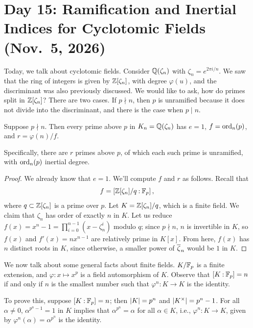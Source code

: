 \section{Day 15: Ramification and Inertial Indices for Cyclotomic Fields (Nov.\ 5, 2026)}
Today, we talk about cyclotomic fields. Consider $\mathbb Q(\zeta_n)$ with $\zeta_n = e^{2\pi i / n}$. We saw that the ring of integers is given by $\mathbb Z[\zeta_n]$, with degree $\varphi(u)$, and the discriminant was also previously discussed. We would like to ask, how do primes split in $\mathbb Z[\zeta_n]$? There are two cases. If $p \nmid n$, then $p$ is unramified because it does not divide into the discriminant, and there is the case when $p \mid n$.

\begin{theorem} \label{thm:ramification_inertia_number_of_primes_for_cyclotomic}
    Suppose $p \nmid n$. Then every prime above $p$ in $K_n = \mathbb Q(\zeta_n)$ has $e = 1$, $f = \operatorname{ord}_n(p)$, and $r = \varphi(n) / f$.
\end{theorem}
Specifically, there are $r$ primes above $p$, of which each such prime is unramified, with $\operatorname{ord}_n(p)$ inertial degree.

\begin{proof}
    We already know that $e = 1$. We'll compute $f$ and $r$ as follows. Recall that
    \[ f = \coor{\ZZ[\zeta_n] / q : \FF_p}, \]
    where $q \subset \mathbb Z[\zeta_n]$ is a prime over $p$. Let $K = \mathbb Z[\zeta_n] / q$, which is a finite field. We claim that $\zeta_n$ has order of exactly $n$ in $K$. Let us reduce $f(x) = x^n - 1 = \prod_{i=0}^{n-1} (x - \zeta_n^i)$ modulo $q$; since $p \nmid n$, $n$ is invertible in $K$, so $f(x)$ and $f'(x) = n x^{n-1}$ are relatively prime in $K[x]$. From here, $f(x)$ has $n$ distinct roots in $K$, since otherwise, a smaller power of $\overline \zeta_n$ would be $1$ in $K$.
\end{proof}

We now talk about some general facts about finite fields. $K/\mathbb F_p$ is a finite extension, and $\varphi \colon x \mapsto x^p$ is a field automorphism of $K$. Observe that $\coor{K : \FF_p} = n$ if and only if $n$ is the smallest number such that $\varphi^n \colon K \to K$ is the identity.

To prove this, suppose $\coor{K : \FF_p} = n$; then $\left\lvert K \right\rvert = p^n$ and $\left\lvert K^\times \right\rvert = p^n - 1$. For all $\alpha \neq 0$, $\alpha^{p^n - 1} = 1$ in $K$ implies that $\alpha^{p^n} = \alpha$ for all $\alpha \in K$, i.e., $\varphi^n \colon K \to K$, given by $\varphi^n(\alpha) = \alpha^{p^n}$ is the identity.

